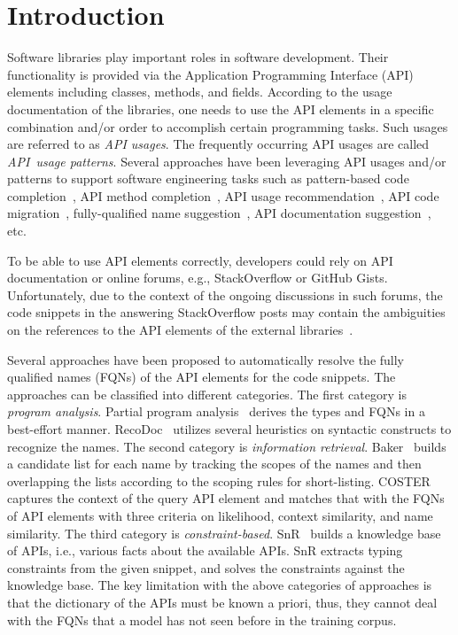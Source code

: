 \section{Introduction}
\label{sec:intro}

Software libraries play important roles in software development. Their
functionality is provided via the Application Programming Interface
(API) elements including classes, methods, and fields. According to
the usage documentation of the libraries, one needs to use the API
elements in a specific combination and/or order to accomplish certain
programming tasks. Such usages are referred to as {\em API
  usages}. The frequently occurring API usages are called~{\em
  API~usage patterns}. Several approaches have been leveraging API
usages and/or patterns to support software engineering tasks such as
pattern-based code completion~\cite{icse12}, API method
completion~\cite{fse16}, API usage recommendation~\cite{icsme18}, API
code migration~\cite{ase14}, fully-qualified name
suggestion~\cite{icse18}, API documentation
suggestion~\cite{liveapi14}, etc.

To be able to use API elements correctly, developers could rely on API
documentation or online forums, e.g., StackOverflow or GitHub
Gists. Unfortunately, due to the context of the ongoing discussions in
such forums, the code snippets in the answering StackOverflow posts
may contain the ambiguities on the references to the API elements of
the external libraries~\cite{liveapi14}.

Several approaches have been proposed to automatically resolve the
fully qualified names (FQNs) of the API elements for the code
snippets.  The approaches can be classified into different
categories. The first category is {\em program analysis}. Partial
program analysis~\cite{dagenais-oopsla08} derives the types and FQNs
in a best-effort manner. RecoDoc~\cite{dagenais-icse12} utilizes
several heuristics on syntactic constructs to recognize the names.
The second category is {\em information
  retrieval}. Baker~\cite{liveapi14} builds a candidate list for each
name by tracking the scopes of the names and then overlapping the
lists according to the scoping rules for short-listing.
COSTER~\cite{coster-ase19} captures the context of the query API
element and matches that with the FQNs of API elements with three
criteria on likelihood, context similarity, and name similarity.  The
third category is {\em constraint-based}. SnR~\cite{snr-icse22} builds
a knowledge base of APIs, i.e., various facts about the available
APIs. SnR extracts typing constraints from the given snippet, and
solves the constraints against the knowledge base. The key limitation
with the above categories of approaches is that the dictionary of the
APIs must be known a priori, thus, they cannot deal with the FQNs that
a model has not seen before in the training corpus.

